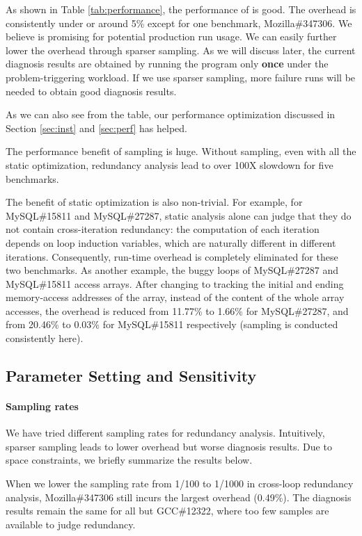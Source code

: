 As shown in Table \ref{tab:performance}, 
the performance of \Tool is good. The overhead is consistently under or around 5\% 
except for one benchmark, Mozilla\#347306. We believe \Tool is promising for potential production
run usage.
We can easily further lower the overhead through sparser sampling.
As we will discuss later, 
the current diagnosis results are obtained by running the
program only \textbf{once} under the problem-triggering workload.
If we use sparser sampling, more failure runs will be needed to obtain good
diagnosis results.

As we can also see from the table, our performance optimization discussed in 
Section \ref{sec:inst} and \ref{sec:perf} has helped.

The performance benefit of sampling is huge.
Without sampling, even with all the static optimization, redundancy
analysis lead to over 100X slowdown for five benchmarks.

The benefit of static optimization is also non-trivial. 
For example, for MySQL\#15811 and MySQL\#27287, static analysis alone can
judge that they do not contain cross-iteration redundancy: the computation of 
each iteration depends on loop induction variables, which are naturally different
in different iterations. Consequently, run-time overhead is completely
eliminated for these two benchmarks.
As another example, the buggy loops of MySQL\#27287 and MySQL\#15811 access 
arrays. 
After changing to tracking the initial and ending memory-access addresses
of the array, instead of the content of the whole array accesses,
the overhead is reduced from 11.77\% to 1.66\% for MySQL\#27287, 
and from 20.46\% to 0.03\% for MySQL\#15811 respectively 
(sampling is conducted consistently here). 

\subsection{Parameter Setting and Sensitivity}
\label{sec:sensi}
\paragraph{Sampling rates}
We have tried different sampling rates for redundancy analysis.
Intuitively, sparser sampling leads to lower overhead but worse diagnosis
results. Due to space constraints, we briefly summarize the results below.

When we lower the sampling rate from 1/100 to 1/1000 
in cross-loop redundancy analysis,
Mozilla\#347306 still incurs the largest overhead (0.49\%). 
The diagnosis results remain the same for all but
GCC\#12322, where too few samples are available
to judge redundancy.

